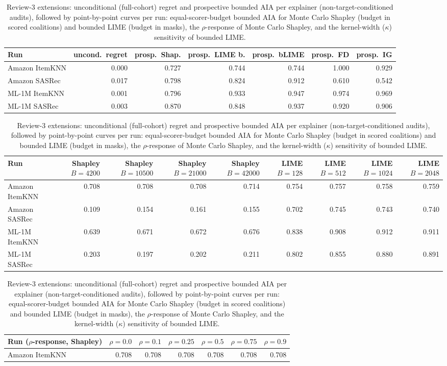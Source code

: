 \begin{table}[t]\centering\scriptsize\setlength{\tabcolsep}{2.5pt}
\caption{Review-3 extensions: unconditional (full-cohort) regret and
prospective bounded AIA per explainer (non-target-conditioned audits),
followed by point-by-point curves per run: equal-scorer-budget bounded AIA
for Monte Carlo Shapley (budget in scored coalitions) and bounded LIME
(budget in masks), the $\rho$-response of Monte Carlo Shapley, and the
kernel-width ($\kappa$) sensitivity of bounded LIME.}
\label{tab:review3-ext}
\begin{tabular}{@{}lrrrrrr@{}}
\toprule
Run & uncond.\ regret & prosp.\ Shap. & prosp.\ LIME b. & prosp.\ bLIME & prosp.\ FD & prosp.\ IG \\
\midrule
Amazon ItemKNN & 0.000 & 0.727 & 0.744 & 0.744 & 1.000 & 0.929 \\
Amazon SASRec & 0.017 & 0.798 & 0.824 & 0.912 & 0.610 & 0.542 \\
ML-1M ItemKNN & 0.001 & 0.796 & 0.933 & 0.947 & 0.974 & 0.969 \\
ML-1M SASRec & 0.003 & 0.870 & 0.848 & 0.937 & 0.920 & 0.906 \\
\bottomrule
\end{tabular}
\par\vspace{2mm}
\begin{tabular}{@{}lrrrrrrrr@{}}
\toprule
Run & Shapley $B{=}4200$ & Shapley $B{=}10500$ & Shapley $B{=}21000$ & Shapley $B{=}42000$ & LIME $B{=}128$ & LIME $B{=}512$ & LIME $B{=}1024$ & LIME $B{=}2048$ \\
\midrule
Amazon ItemKNN & 0.708 & 0.708 & 0.708 & 0.714 & 0.754 & 0.757 & 0.758 & 0.759 \\
Amazon SASRec & 0.109 & 0.154 & 0.161 & 0.155 & 0.702 & 0.745 & 0.743 & 0.740 \\
ML-1M ItemKNN & 0.639 & 0.671 & 0.672 & 0.676 & 0.838 & 0.908 & 0.912 & 0.911 \\
ML-1M SASRec & 0.203 & 0.197 & 0.202 & 0.211 & 0.802 & 0.855 & 0.880 & 0.891 \\
\bottomrule
\end{tabular}
\par\vspace{2mm}
\begin{tabular}{@{}lrrrrrr@{}}
\toprule
Run ($\rho$-response, Shapley) & $\rho=0.0$ & $\rho=0.1$ & $\rho=0.25$ & $\rho=0.5$ & $\rho=0.75$ & $\rho=0.9$ \\
\midrule
Amazon ItemKNN & 0.708 & 0.708 & 0.708 & 0.708 & 0.708 & 0.708 \\

\end{tabular}
\end{table}
